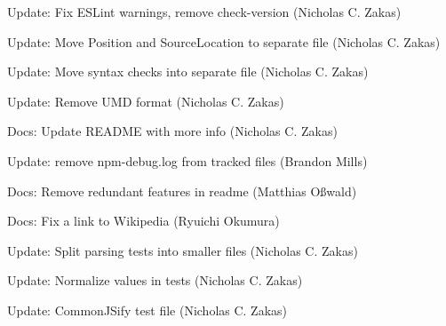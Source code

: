 \begin{DoxyItemize}
\item Update\+: Fix E\+S\+Lint warnings, remove check-\/version (Nicholas C. Zakas)
\item Update\+: Move Position and Source\+Location to separate file (Nicholas C. Zakas)
\item Update\+: Move syntax checks into separate file (Nicholas C. Zakas)
\item Update\+: Remove U\+MD format (Nicholas C. Zakas)
\item Docs\+: Update R\+E\+A\+D\+ME with more info (Nicholas C. Zakas)
\item Update\+: remove npm-\/debug.\+log from tracked files (Brandon Mills)
\item Docs\+: Remove redundant \textquotesingle{}features\textquotesingle{} in readme (Matthias Oßwald)
\item Docs\+: Fix a link to Wikipedia (Ryuichi Okumura)
\item Update\+: Split parsing tests into smaller files (Nicholas C. Zakas)
\item Update\+: Normalize values in tests (Nicholas C. Zakas)
\item Update\+: Common\+J\+Sify test file (Nicholas C. Zakas) 
\end{DoxyItemize}